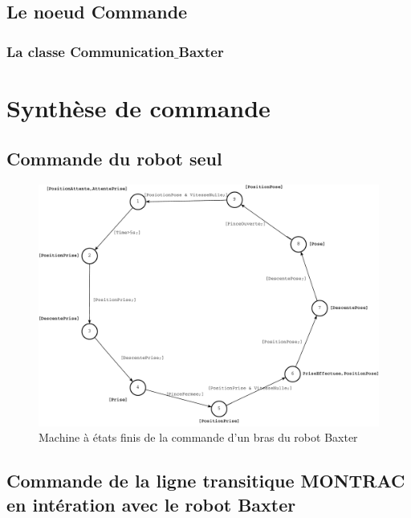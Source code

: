 \documentclass[a4paper,french, titlepage]{article}
\begin{document}
\subsection{Le noeud Commande}

\subsubsection{La classe Communication$\_$Baxter}







\newpage
\section{Synthèse de commande}

\subsection{Commande du robot seul}

\begin{figure}[H] 
\begin{center}
\includegraphics[scale=0.5]{Images/main_commande_1_bras.pdf} 
\end{center}
\caption{Machine à états finis de la commande d'un bras du robot Baxter}
\label{main_commande_1_bras}
\end{figure} 

\subsection{Commande de la ligne transitique MONTRAC en intération avec le robot Baxter}
\end{document}
